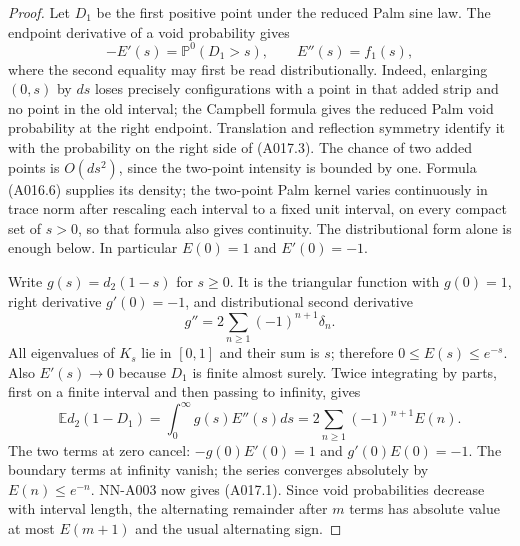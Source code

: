 \begin{proof}
Let $D_1$ be the first positive point under the reduced Palm sine law.
The endpoint derivative of a void probability gives
\[
 -E'(s)=\mathbb P^0(D_1>s),\qquad E''(s)=f_1(s),
                                                        \tag{A017.3}
\]
where the second equality may first be read distributionally.
Indeed, enlarging $(0,s)$ by $ds$ loses precisely configurations
with a point in that added strip and no point in the old interval;
the Campbell formula gives the reduced Palm void probability at
the right endpoint. Translation and reflection symmetry identify
it with the probability on the right side of (A017.3).
The chance of two added points is $O(ds^2)$, since the two-point
intensity is bounded by one. Formula (A016.6) supplies its density;
the two-point Palm kernel varies continuously in trace norm after
rescaling each interval to a fixed unit interval, on every compact
set of $s>0$, so that formula also gives continuity. The distributional
form alone is enough below. In particular $E(0)=1$ and $E'(0)=-1$.

Write $g(s)=d_2(1-s)$ for $s\ge0$. It is the triangular function
with $g(0)=1$, right derivative $g'(0)=-1$, and distributional
second derivative
\[
 g''=2\sum_{n\ge1}(-1)^{n+1}\delta_n.
\]
All eigenvalues of $K_s$ lie in $[0,1]$ and their sum is $s$;
therefore $0\le E(s)\le e^{-s}$. Also $E'(s)\to0$ because
$D_1$ is finite almost surely. Twice integrating by parts, first on
a finite interval and then passing to infinity, gives
\[
 \mathbb E d_2(1-D_1)
 =\int_0^\infty g(s)E''(s)ds
 =2\sum_{n\ge1}(-1)^{n+1}E(n).
\]
The two terms at zero cancel: $-g(0)E'(0)=1$ and
$g'(0)E(0)=-1$. The boundary terms at infinity vanish; the series
converges absolutely by $E(n)\le e^{-n}$. NN-A003 now gives
(A017.1). Since void probabilities decrease with interval length,
the alternating remainder after $m$ terms has absolute value at
most $E(m+1)$ and the usual alternating sign.


\end{proof}
